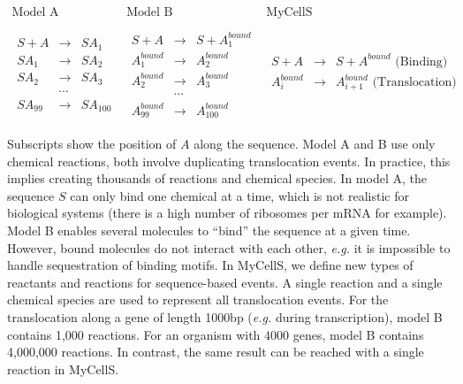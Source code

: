\[
\begin{array}{c|c|c}
  \text{Model A} & \text{Model B} & \text{MyCellS}\\
  & & \\
  \begin{array}{rcl}
    S + A & \rightarrow & SA_1 \\
    SA_1 & \rightarrow & SA_2 \\
    SA_2 & \rightarrow & SA_3 \\
          & \cdots & \\
    SA_{99} & \rightarrow & SA_{100}
  \end{array}
  &
  \begin{array}{rcl}
    S + A & \rightarrow & S + A^{bound}_1 \\
    A^{bound}_1 & \rightarrow & A^{bound}_2 \\
    A^{bound}_2 & \rightarrow & A^{bound}_3 \\
          & \cdots & \\
    A^{bound}_{99} & \rightarrow & A^{bound}_{100}
  \end{array}
  &
  \begin{array}{rcl}
    S + A & \rightarrow & S + A^{bound} \text{ (Binding)} \\
    A^{bound}_i & \rightarrow & A^{bound}_{i+1} \text{ (Translocation)} \\
  \end{array}
\end{array}
\]

Subscripts show the position of $A$ along the sequence.
Model A and B use only chemical reactions, both involve duplicating
translocation events.
In practice, this implies creating thousands of reactions and chemical
species.
In model A, the sequence $S$ can only bind one chemical at a time,
which is not realistic for biological systems
(there is a high number of ribosomes per mRNA for example).
Model B enables several molecules to ``bind'' the sequence at a given time.
However, bound molecules do not interact with each other,
\textit{e.g.} it is impossible to handle sequestration of binding motifs.
In MyCellS, we define new types of reactants and reactions
for sequence-based events.
A single reaction and a single chemical species are used to represent
all translocation events.
For the translocation along a gene of length 1000bp
(\textit{e.g.} during transcription),
model B contains 1,000 reactions.
For an organism with 4000 genes, model B contains 4,000,000 reactions.
In contrast, the same result can be reached with a single reaction in MyCellS.

